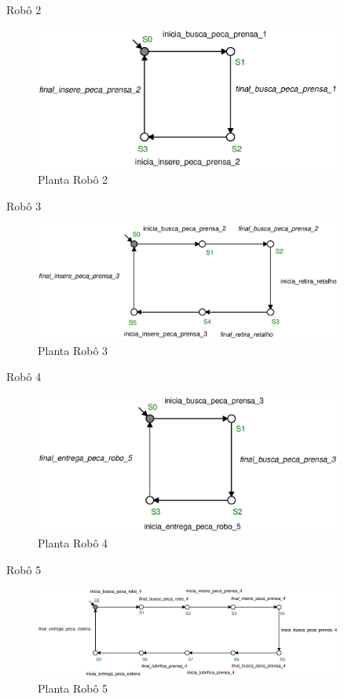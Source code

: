 Robô 2
\begin{figure}[H]%
    \centering
    \includegraphics[width=0.9\textwidth]{imagens/robo_2.eps}
    \caption{Planta Robô 2}\label{fig:robo2}
\end{figure}

Robô 3
\begin{figure}[H]%
    \centering
    \includegraphics[width=0.9\textwidth]{imagens/robo_3.eps}
    \caption{Planta Robô 3}\label{fig:robo3}
\end{figure}

Robô 4
\begin{figure}[H]%
    \centering
    \includegraphics[width=0.9\textwidth]{imagens/robo_4.eps}
    \caption{Planta Robô 4}\label{fig:robo4}
\end{figure}

Robô 5
\begin{figure}[H]%
    \centering
    \includegraphics[width=0.9\textwidth]{imagens/robo_5.eps}
    \caption{Planta Robô 5}\label{fig:robo5}
\end{figure}

